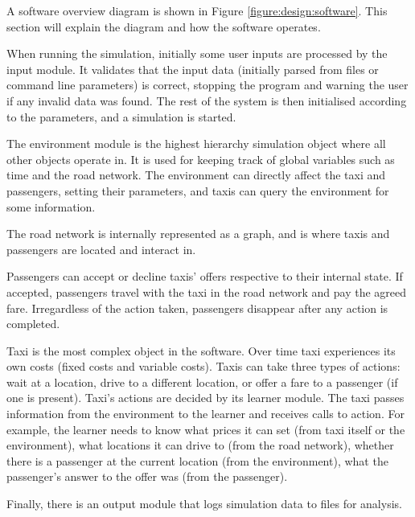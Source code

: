 A software overview diagram is shown in Figure \ref{figure:design:software}.
This section will explain the diagram and how the software operates.

When running the simulation, initially some user inputs are processed by the
input module. It validates that the input data (initially parsed from files or
command line parameters) is correct, stopping the program and warning the user
if any invalid data was found. The rest of the system is then initialised
according to the parameters, and a simulation is started.

The environment module is the highest hierarchy simulation object where all
other objects operate in. It is used for keeping track of global variables such
as time and the road network. The environment can directly affect the taxi and
passengers, setting their parameters, and taxis can query the environment for
some information.

The road network is internally represented as a graph, and is where taxis and
passengers are located and interact in.

Passengers can accept or decline taxis' offers respective to their internal state. If
accepted, passengers travel with the taxi in the road network and pay the
agreed fare. Irregardless of the action taken, passengers disappear after any
action is completed.

Taxi is the most complex object in the software. Over time taxi experiences its
own costs (fixed costs and variable costs). Taxis can take three types of
actions: wait at a location, drive to a different location, or offer a fare to
a passenger (if one is present). Taxi's actions are decided by its learner
module. The taxi passes information from the environment to the learner and
receives calls to action. For example, the learner needs to know what prices it
can set (from taxi itself or the environment), what locations it can drive to
(from the road network), whether there is a passenger at the current location
(from the environment), what the passenger's answer to the offer was (from the
passenger).

Finally, there is an output module that logs simulation data to files for
analysis.

